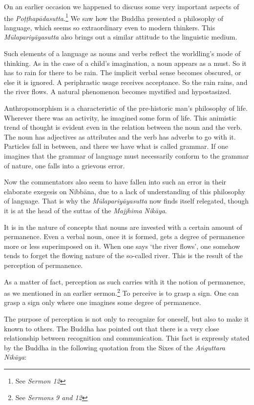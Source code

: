 On an earlier occasion we happened to discuss some very important aspects of the \emph{Poṭṭhapādasutta}.\footnote{See \emph{Sermon 12}} We saw how the Buddha presented a philosophy of language, which seems so extraordinary even to modern thinkers. This \emph{Mūlapariyāyasutta} also brings out a similar attitude to the linguistic medium.

Such elements of a language as nouns and verbs reflect the worldling's mode of thinking. As in the case of a child's imagination, a noun appears as a must. So it has to rain for there to be rain. The implicit verbal sense becomes obscured, or else it is ignored. A periphrastic usage receives acceptance. So the rain rains, and the river flows. A natural phenomenon becomes mystified and hypostasized.

Anthropomorphism is a characteristic of the pre-historic man's philosophy of life. Wherever there was an activity, he imagined some form of life. This animistic trend of thought is evident even in the relation between the noun and the verb. The noun has adjectives as attributes and the verb has adverbs to go with it. Particles fall in between, and there we have what is called grammar. If one imagines that the grammar of language must necessarily conform to the grammar of nature, one falls into a grievous error.

Now the commentators also seem to have fallen into such an error in their elaborate exegesis on Nibbāna, due to a lack of understanding of this philosophy of language. That is why the \emph{Mūlapariyāyasutta} now finds itself relegated, though it is at the head of the suttas of the \emph{Majjhima Nikāya}.

It is in the nature of concepts that nouns are invested with a certain amount of permanence. Even a verbal noun, once it is formed, gets a degree of permanence more or less superimposed on it. When one says `the river flows', one somehow tends to forget the flowing nature of the so-called river. This is the result of the perception of permanence.

As a matter of fact, perception as such carries with it the notion of permanence, as we mentioned in an earlier sermon.\footnote{See \emph{Sermons 9 and 12}} To perceive is to grasp a sign. One can grasp a sign only where one imagines some degree of permanence.

The purpose of perception is not only to recognize for oneself, but also to make it known to others. The Buddha has pointed out that there is a very close relationship between recognition and communication. This fact is expressly stated by the Buddha in the following quotation from the Sixes of the \emph{Aṅguttara Nikāya}:

